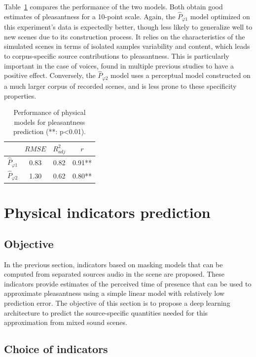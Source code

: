 \documentclass[11pt,a4paper]{article}
\begin{document}
Table~\ref{tab:physm} compares the performance of the two models. Both obtain good estimates of pleasantness for a 10-point scale. Again, the $\hat P_{\varphi 1}$ model optimized on this experiment's data is expectedly better, though less likely to generalize well to new scenes due to its construction process. It relies on the characteristics of the simulated scenes in terms of isolated samples variability and content, which leads to corpus-specific source contributions to pleasantness. This is particularly important in the case of voices, found in multiple previous studies to have a positive effect. Conversely, the $\hat P_{\varphi 2}$ model uses a perceptual model constructed on a much larger corpus of recorded scenes, and is less prone to these specificity properties.

\begin{table}[t]
\centering
\caption{Performance of physical models for pleasantness prediction (**: p<0.01).}
\label{tab:physm}
\begin{tabular}{ c | c | c | c }
\hline
	 & $RMSE$ & $R^2_{adj}$ & $r$ \\ \hline
	$\hat P_{\varphi 1}$ & 0.83 & 0.82 & 0.91** \\
	$\hat P_{\varphi 2}$ & 1.30 & 0.62 & 0.80** \\ \hline
\end{tabular}
\end{table}



\section{Physical indicators prediction}

\subsection{Objective}

In the previous section,  indicators based on masking models that can be computed from separated sources audio in the scene are proposed. These indicators provide estimates of the perceived time of presence that can be used to approximate pleasantness using a simple linear model with relatively low prediction error. The objective of this section is to propose a deep learning architecture to predict the source-specific quantities needed for this approximation from mixed sound scenes.

\subsection{Choice of indicators}
\end{document}
